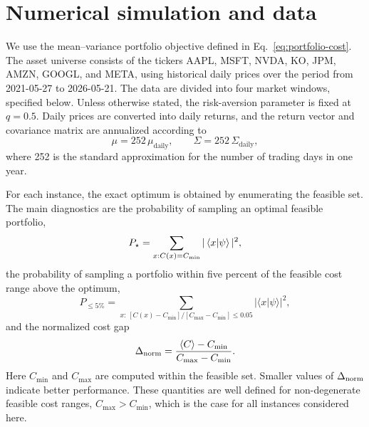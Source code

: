 \section{\label{sec:simulation}Numerical simulation and data}

We use the mean--variance portfolio objective defined in
Eq.~\eqref{eq:portfolio-cost}. The asset universe consists of the tickers
AAPL, MSFT, NVDA, KO, JPM, AMZN, GOOGL, and META, using historical daily prices
over the period from 2021-05-27 to 2026-05-21. The data are divided into four
market windows, specified below. Unless otherwise stated, the risk-aversion
parameter is fixed at \(q=0.5\). Daily prices are converted into daily
returns, and the return vector and covariance matrix are annualized according
to
\begin{equation}
    \mu = 252\,\mu_{\mathrm{daily}},
    \qquad
    \Sigma = 252\,\Sigma_{\mathrm{daily}},
\end{equation}
where 252 is the standard approximation for the number of trading days in one
year.

For each instance, the exact optimum is obtained by enumerating the feasible
set. The main diagnostics are the probability of sampling an optimal feasible
portfolio,
\begin{equation}
    P_\star = \sum_{x:C(x)=C_{\min}} |\braket{x}{\psi}|^2,
\end{equation}
the probability of sampling a portfolio within five percent of the feasible
cost range above the optimum,
\begin{equation}
    P_{\leq 5\%}
    =
    \sum_{x:\, [C(x)-C_{\min}]/[C_{\max}-C_{\min}]\leq 0.05}
    |\langle x|\psi\rangle|^2 ,
    \label{eq:p-five-percent}
\end{equation}
and the normalized cost gap
\begin{equation}
    \Delta_{\rm norm}
    =
    \frac{\langle C\rangle-C_{\min}}{C_{\max}-C_{\min}} .
    \label{eq:normalized-gap}
\end{equation}
Here \(C_{\min}\) and \(C_{\max}\) are computed within the feasible set.
Smaller values of \(\Delta_{\rm norm}\) indicate better performance. These quantities are well defined for non-degenerate feasible cost ranges,
\(C_{\max}>C_{\min}\), which is the case for all instances considered here.


